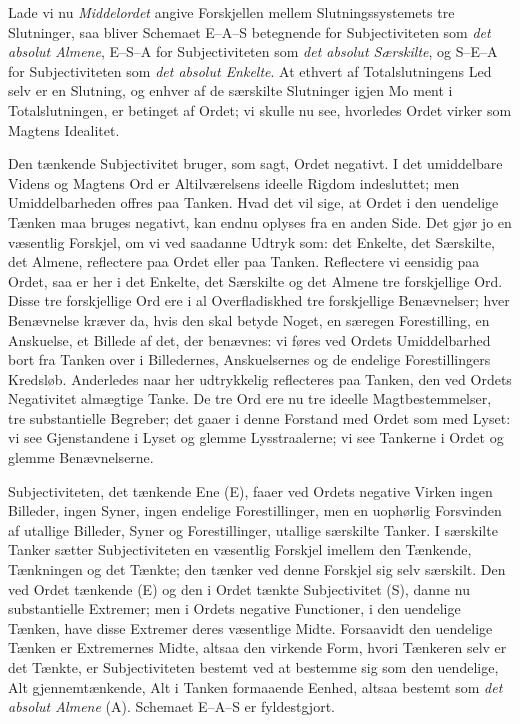\documentclass[12pt]{book}
\newcommand{\opage}[1]{\marginnote{\footnotesize\textit{[#1]}}}
\begin{document}
Lade vi nu \emph{Middelordet} angive Forskjellen mellem Slutningssystemets tre Slutninger, saa bliver Schemaet E--A--S betegnende for Subjectiviteten som \emph{det absolut Almene}, E--S--A for Subjectiviteten som \emph{det absolut Særskilte}, og S--E--A for Subjectiviteten som \emph{det absolut Enkelte}. At ethvert af Totalslutningens Led selv er en Slutning, og enhver af de særskilte Slutninger igjen Mo%
\opage{338}ment i Totalslutningen, er betinget af Ordet; vi skulle nu see, hvorledes Ordet virker som Magtens Idealitet.

Den tænkende Subjectivitet bruger, som sagt, Ordet negativt. I det umiddelbare Videns og Magtens Ord er Altilværelsens ideelle Rigdom indesluttet; men Umiddelbarheden offres paa Tanken. Hvad det vil sige, at Ordet i den uendelige Tænken maa bruges negativt, kan endnu oplyses fra en anden Side. Det gjør jo en væsentlig Forskjel, om vi ved saadanne Udtryk som: det Enkelte, det Særskilte, det Almene, reflectere paa Ordet eller paa Tanken. Reflectere vi eensidig paa Ordet, saa er her i det Enkelte, det Særskilte og det Almene tre forskjellige Ord. Disse tre forskjellige Ord ere i al Overfladiskhed tre forskjellige Benævnelser; hver Benævnelse kræver da, hvis den skal betyde Noget, en særegen Forestilling, en Anskuelse, et Billede af det, der benævnes: vi føres ved Ordets Umiddelbarhed bort fra Tanken over i Billedernes, Anskuelsernes og de endelige Forestillingers Kredsløb. Anderledes naar her udtrykkelig reflecteres paa Tanken, den ved Ordets Negativitet almægtige Tanke. De tre Ord ere nu tre ideelle Magtbestemmelser, tre substantielle Begreber; det gaaer i denne Forstand med Ordet som med Lyset: vi see Gjenstandene i Lyset og glemme Lysstraalerne; vi see Tankerne i Ordet og glemme Benævnelserne.

Subjectiviteten, det tænkende Ene (E), faaer ved Ordets negative Virken ingen Billeder, ingen Syner, ingen endelige Forestillinger, men en uophørlig Forsvinden af utallige Billeder, Syner og Forestillinger, utallige særskilte Tanker. I særskilte Tanker sætter Subjectiviteten en væsentlig Forskjel imellem den Tænkende, Tænkningen og det Tænkte; den tænker ved denne Forskjel sig selv særskilt. Den ved Ordet tænkende (E) og den i Ordet tænkte Subjectivitet (S), danne nu substantielle Extremer; men i Ordets negative Functioner, i den uendelige Tænken, have disse Extremer deres væsentlige Midte. Forsaavidt den uendelige Tænken er Extremernes Midte, altsaa den virkende Form, hvori Tænkeren selv er det Tænkte, er Subjectiviteten bestemt ved at bestemme sig som den uendelige, Alt gjennemtænkende,
\opage{339}Alt i Tanken formaaende Eenhed, altsaa bestemt som \emph{det absolut Almene} (A). Schemaet E--A--S er fyldestgjort.
\end{document}
